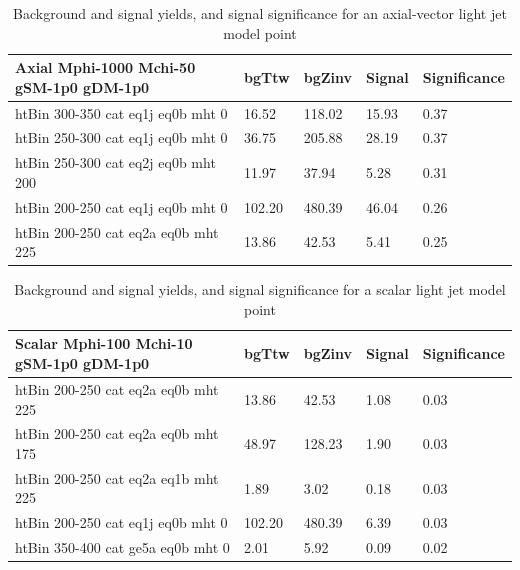 \begin{table}
\small
\begin{center}
\caption{Background and signal yields, and signal significance for an axial-vector light jet model point}
\label{tab:MSB_A_g1_2fb}
\begin{tabular}{|l|l|l|l|l|}
\textbf{Axial Mphi-1000 Mchi-50 gSM-1p0 gDM-1p0}    &  bgTtw    &  bgZinv   &  Signal &
Significance \\ 
\hline
htBin 300-350 cat eq1j eq0b mht 0 &     16.52    &  118.02   &  15.93   &0.37 \\ 
htBin 250-300 cat eq1j eq0b mht 0 &     36.75    &  205.88   &  28.19   &0.37 \\ 
htBin 250-300 cat eq2j eq0b mht 200 &   11.97    &  37.94    &  5.28    &0.31 \\ 
htBin 200-250 cat eq1j eq0b mht 0 &     102.20   &  480.39   &  46.04   &0.26 \\ 
htBin 200-250 cat eq2a eq0b mht 225 &   13.86    &  42.53    &  5.41    &0.25 \\ 
\end{tabular}
\end{center}
\end{table}

\clearpage

\begin{table}
\small
\begin{center}
\caption{Background and signal yields, and signal significance for a scalar light jet model point}
\label{tab:MSB_S_g1_2fb}
\begin{tabular}{|l|l|l|l|l|}
\textbf{Scalar Mphi-100 Mchi-10 gSM-1p0 gDM-1p0}    &  bgTtw    &  bgZinv   &  Signal &
Significance \\ 
\hline
htBin 200-250 cat eq2a eq0b mht 225 &   13.86    &  42.53    &  1.08    &0.03 \\ 
htBin 200-250 cat eq2a eq0b mht 175 &   48.97    &  128.23   &  1.90    &0.03 \\ 
htBin 200-250 cat eq2a eq1b mht 225 &   1.89     &  3.02     &  0.18    &0.03 \\ 
htBin 200-250 cat eq1j eq0b mht 0 &     102.20   &  480.39   &  6.39    &0.03 \\ 
htBin 350-400 cat ge5a eq0b mht 0 &     2.01     &  5.92     &  0.09    &0.02 \\ 
\end{tabular}
\end{center}
\end{table}

